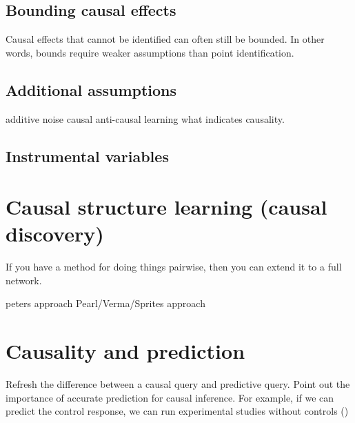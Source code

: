 \documentclass[11pt,a4paper]{article}
\begin{document}
\subsection{Bounding causal effects}
Causal effects that cannot be identified can often still be bounded. In other words, bounds require weaker assumptions than point identification.
 
\subsection{Additional assumptions}
additive noise
causal anti-causal \cite{Janzing2012}
learning what indicates causality. 

\subsection{Instrumental variables}



\section{Causal structure learning (causal discovery)}
\label{sec:causaldiscovery}
If you have a method for doing things pairwise, then you can extend it to a full network. 

peters approach \cite{Peters2014}
Pearl/Verma/Sprites approach \cite{Pearl2000} 


\section{Causality and prediction}
Refresh the difference between a causal query and predictive query.
Point out the importance of accurate prediction for causal inference. For example, if we can predict the control response, we can run experimental studies without controls (\cite{Brodersen2013})


\end{document}
